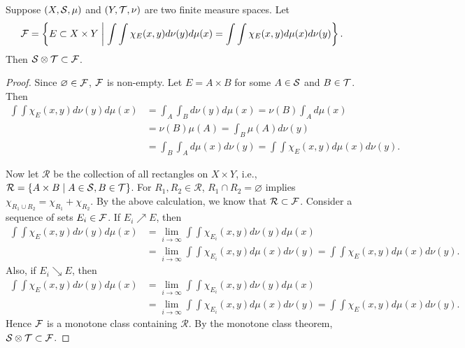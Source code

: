 \begin{lemma}\label{lem:product_sigma_algebra}
    Suppose $(X,\S,\mu)$ and $(Y,\T,\nu)$ are two finite measure spaces. Let 
    \begin{equation*}
        \F = \Set{E\subset X\times Y}{\int\int \chi_E(x,y)d\nu(y)d\mu(x) = \int\int \chi_E(x,y)d\mu(x)d\nu(y)}.
    \end{equation*}
    Then $\S\otimes\T\subset\F$.
\end{lemma}
\begin{proof}
    Since $\varnothing\in\F$, $\F$ is non-empty. Let $E = A\times B$ for some 
    $A\in\S$ and $B\in\T$. Then 
    \begin{equation*}
        \begin{split}
            \int\int \chi_E(x,y)d\nu(y)d\mu(x) 
            &= \int_A\int_B d\nu(y)d\mu(x) = \nu(B)\int_A d\mu(x)\\
            &= \nu(B)\mu(A) = \int_B\mu(A)d\nu(y)\\
            &= \int_B\int_A d\mu(x)d\nu(y) = \int\int \chi_E(x,y)d\mu(x)d\nu(y).
        \end{split}
    \end{equation*}

    Now let $\mathcal{R}$ be the collection of all rectangles on $X\times Y$, i.e., 
    $\mathcal{R} = \Set{A\times B}{A\in\S, B\in\T}$. For $R_1,R_2\in\mathcal{R}$, 
    $R_1\cap R_2 = \varnothing$ implies $\chi_{R_1\cup R_2} = \chi_{R_1} + \chi_{R_2}$. 
    By the above calculation, we know that $\mathcal{R}\subset\F$. Consider 
    a sequence of sets $E_i\in\F$. If $E_i\nearrow E$, then
    \begin{equation*}
        \begin{split}
            \int\int \chi_E(x,y)d\nu(y)d\mu(x) 
            &= \lim_{i\to\infty}\int\int \chi_{E_i}(x,y)d\nu(y)d\mu(x)\\
            &= \lim_{i\to\infty}\int\int \chi_{E_i}(x,y)d\mu(x)d\nu(y)
            = \int\int \chi_E(x,y)d\mu(x)d\nu(y).
        \end{split}
    \end{equation*}
    Also, if $E_i\searrow E$, then 
    \begin{equation*}
        \begin{split}
            \int\int \chi_E(x,y)d\nu(y)d\mu(x) 
            &= \lim_{i\to\infty}\int\int \chi_{E_i}(x,y)d\nu(y)d\mu(x)\\
            &= \lim_{i\to\infty}\int\int \chi_{E_i}(x,y)d\mu(x)d\nu(y)
            = \int\int \chi_E(x,y)d\mu(x)d\nu(y).
        \end{split}
    \end{equation*}
    Hence $\F$ is a monotone class containing $\mathcal{R}$. By the monotone 
    class theorem, $\S\otimes\T\subset\F$.
\end{proof}

